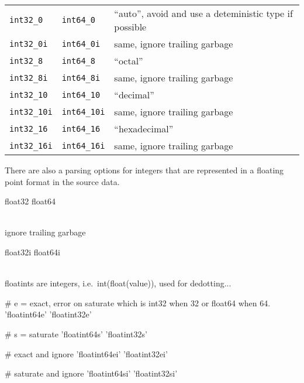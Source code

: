 \begin{tabular}{lll}
  \texttt{int32\_0}   & \texttt{int64\_0}   & ``auto'', avoid and use a deteministic type if possible \\
  \texttt{int32\_0i}  & \texttt{int64\_0i}  & same, ignore trailing garbage \\
  \texttt{int32\_8}   & \texttt{int64\_8}   & ``octal'' \\
  \texttt{int32\_8i}  & \texttt{int64\_8i}  & same, ignore trailing garbage \\
  \texttt{int32\_10}  & \texttt{int64\_10}  & ``decimal'' \\
  \texttt{int32\_10i} & \texttt{int64\_10i} & same, ignore trailing garbage \\
  \texttt{int32\_16}  & \texttt{int64\_16}  & ``hexadecimal'' \\
  \texttt{int32\_16i} & \texttt{int64\_16i} & same, ignore trailing garbage \\
\end{tabular}

There are also a parsing options for integers that are represented in a floating
point format in the source data.



\begin{python}
float32
float64
\end{python}
\\
ignore trailing garbage
\\
\begin{python}
float32i
float64i
\end{python}
\\
floatints are integers, i.e.\ int(float(value)), used for dedotting...
\\
\begin{python}
# e = exact, error on saturate which is int32 when 32 or float64 when 64.
'floatint64e'  
'floatint32e'  
\end{python}

\begin{python}
# s = saturate
'floatint64s'  
'floatint32s'  
\end{python}

\begin{python}
# exact and ignore
'floatint64ei' 
'floatint32ei' 
\end{python}

\begin{python}
# saturate and ignore
'floatint64si' 
'floatint32si' 
\end{python}

